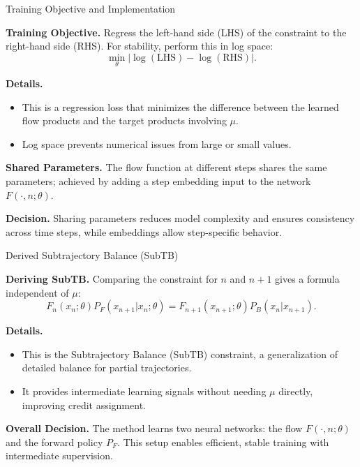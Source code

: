 \documentclass[aspectratio=169,xcolor=dvipsnames]{beamer}
\begin{document}
\begin{frame}[t]{Training Objective and Implementation}
\footnotesize

\textbf{Training Objective.} Regress the left-hand side (LHS) of the constraint to the right-hand side (RHS). For stability, perform this in log space:
\[
\min_\theta \left| \log(\text{LHS}) - \log(\text{RHS}) \right|.
\]

\textbf{Details.}
\begin{itemize}\itemsep2pt
  \item This is a regression loss that minimizes the difference between the learned flow products and the target products involving $\mu$.
  \item Log space prevents numerical issues from large or small values.
\end{itemize}

\textbf{Shared Parameters.} The flow function at different steps shares the same parameters; achieved by adding a step embedding input to the network $F(\cdot, n; \theta)$.

\textbf{Decision.} Sharing parameters reduces model complexity and ensures consistency across time steps, while embeddings allow step-specific behavior.

\end{frame}

\begin{frame}[t]{Derived Subtrajectory Balance (SubTB)}
\footnotesize

\textbf{Deriving SubTB.} Comparing the constraint for $n$ and $n+1$ gives a formula independent of $\mu$:
\[
F_n(x_n; \theta) P_F(x_{n+1} | x_n; \theta) = F_{n+1}(x_{n+1}; \theta) P_B(x_n | x_{n+1}).
\]

\textbf{Details.}
\begin{itemize}\itemsep2pt
  \item This is the Subtrajectory Balance (SubTB) constraint, a generalization of detailed balance for partial trajectories.
  \item It provides intermediate learning signals without needing $\mu$ directly, improving credit assignment.
\end{itemize}

\textbf{Overall Decision.} The method learns two neural networks: the flow $F(\cdot, n; \theta)$ and the forward policy $P_F$. This setup enables efficient, stable training with intermediate supervision.
\end{frame}
\end{document}
